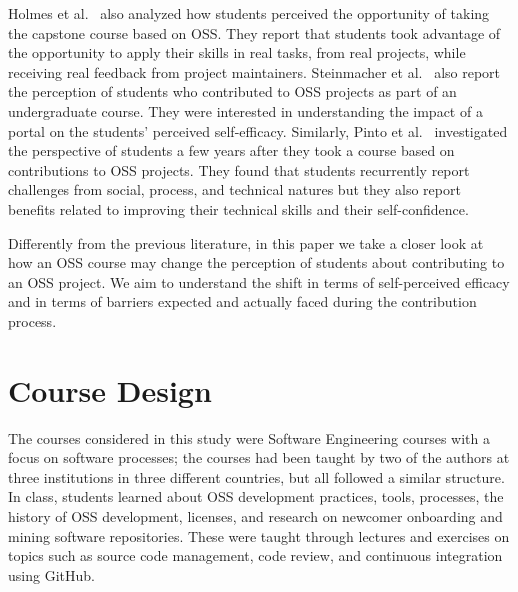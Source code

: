\documentclass[sigconf]{acmart}
\begin{document}
\begin{sloppy}
Holmes et al.~\cite{holmes2018dimensions} also analyzed how students perceived the opportunity of taking the capstone course based on OSS. They report that students took advantage of the opportunity to apply their skills in real tasks, from real projects, while receiving real feedback from project maintainers. Steinmacher et al.~\cite{steinmacher2016overcoming} also report the perception of students who contributed to OSS projects as part of an undergraduate course. They were interested in understanding the impact of a portal on the students' perceived self-efficacy. 
Similarly, Pinto et al.~\cite{pinto2019training} investigated the perspective of students a few years after they took a course based on contributions to OSS projects. They found that students recurrently report challenges from social, process, and technical natures but they also report benefits related to improving their technical skills and their self-confidence. 

Differently from the previous literature, in this paper we take a closer look at how an OSS course may change the perception of students about contributing to an OSS project. We aim to understand the shift in terms of self-perceived efficacy and in terms of barriers expected and actually faced during the contribution process.

\section{Course Design}

The courses considered in this study were Software Engineering courses with a focus on software processes; the courses had been taught by two of the authors at three institutions in three different countries, but all followed a similar structure. In class, students learned about OSS development practices, tools, processes, the history of OSS development, licenses, and research on newcomer onboarding and mining software repositories. These were taught through lectures and exercises on topics such as source code management, code review, and continuous integration using GitHub. 



\end{sloppy}
\end{document}

